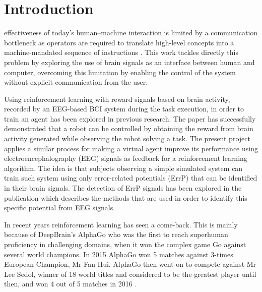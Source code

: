 \documentclass[journal]{IEEEtran}
\begin{document}
\section{Introduction}


 effectiveness of today's human–machine interaction is limited by a communication bottleneck as operators are required to translate high-level concepts into a machine-mandated sequence of instructions \cite{CURSOR-CONTROL-PAPER}. This work tackles directly this problem by exploring the use of brain signals as an interface between human and computer, overcoming this limitation by enabling the control of the system without explicit communication from the user. 

Using reinforcement learning with reward signals based on brain activity, recorded by an EEG-based BCI system during the task execution, in order to train an agent has been explored in previous research. The paper \cite{ROBOT-CONTROL-PAPER} has successfully demonstrated that a robot can be controlled by obtaining the reward from brain activity generated while observing the robot solving a task. The present project applies a similar process for making a virtual agent improve its performance using electroencephalography (EEG) signals as feedback for a reinforcement learning algorithm. The idea is that subjects observing a simple simulated system can train such system using only error-related potentials (ErrP) that can be identified in their brain signals. The detection of ErrP signals has been explored in the publication \cite{EERP-PAPER} which describes the methods that are used in order to identify this specific potential from EEG signals.

In recent years reinforcement learning has seen a come-back. This is mainly because of DeepBrain's AlphaGo who was the first to reach superhuman proficiency in challenging domains, when it won the complex game Go against several world champions. In 2015 AlphaGo won 5 matches against 3-times European Champion, Mr Fan Hui. AlphaGo then went on to compete against Mr Lee Sedol, winner of 18 world titles and considered to be the greatest player until then, and won 4 out of 5 matches in 2016 \cite{ALPHA-GO}.
\end{document}
